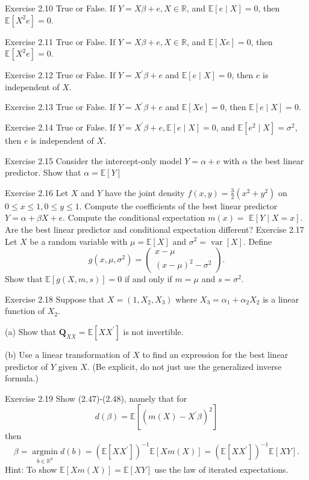 \documentclass[10pt]{article}
\begin{document}
Exercise 2.10 True or False. If $Y=X \beta+e, X \in \mathbb{R}$, and $\mathbb{E}[e \mid X]=0$, then $\mathbb{E}\left[X^{2} e\right]=0$.

Exercise 2.11 True or False. If $Y=X \beta+e, X \in \mathbb{R}$, and $\mathbb{E}[X e]=0$, then $\mathbb{E}\left[X^{2} e\right]=0$.

Exercise 2.12 True or False. If $Y=X^{\prime} \beta+e$ and $\mathbb{E}[e \mid X]=0$, then $e$ is independent of $X$.

Exercise 2.13 True or False. If $Y=X^{\prime} \beta+e$ and $\mathbb{E}[X e]=0$, then $\mathbb{E}[e \mid X]=0$.

Exercise 2.14 True or False. If $Y=X^{\prime} \beta+e, \mathbb{E}[e \mid X]=0$, and $\mathbb{E}\left[e^{2} \mid X\right]=\sigma^{2}$, then $e$ is independent of $X$.

Exercise 2.15 Consider the intercept-only model $Y=\alpha+e$ with $\alpha$ the best linear predictor. Show that $\alpha=\mathbb{E}[Y]$

Exercise 2.16 Let $X$ and $Y$ have the joint density $f(x, y)=\frac{3}{2}\left(x^{2}+y^{2}\right)$ on $0 \leq x \leq 1,0 \leq y \leq 1$. Compute the coefficients of the best linear predictor $Y=\alpha+\beta X+e$. Compute the conditional expectation $m(x)=$ $\mathbb{E}[Y \mid X=x]$. Are the best linear predictor and conditional expectation different? Exercise 2.17 Let $X$ be a random variable with $\mu=\mathbb{E}[X]$ and $\sigma^{2}=\operatorname{var}[X]$. Define
$$
g\left(x, \mu, \sigma^{2}\right)=\left(\begin{array}{c}
x-\mu \\
(x-\mu)^{2}-\sigma^{2}
\end{array}\right) .
$$
Show that $\mathbb{E}[g(X, m, s)]=0$ if and only if $m=\mu$ and $s=\sigma^{2}$.

Exercise 2.18 Suppose that $X=\left(1, X_{2}, X_{3}\right)$ where $X_{3}=\alpha_{1}+\alpha_{2} X_{2}$ is a linear function of $X_{2}$.

(a) Show that $\boldsymbol{Q}_{X X}=\mathbb{E}\left[X X^{\prime}\right]$ is not invertible.

(b) Use a linear transformation of $X$ to find an expression for the best linear predictor of $Y$ given $X$. (Be explicit, do not just use the generalized inverse formula.)

Exercise 2.19 Show (2.47)-(2.48), namely that for
$$
d(\beta)=\mathbb{E}\left[\left(m(X)-X^{\prime} \beta\right)^{2}\right]
$$
then
$$
\beta=\underset{b \in \mathbb{R}^{k}}{\operatorname{argmin}} d(b)=\left(\mathbb{E}\left[X X^{\prime}\right]\right)^{-1} \mathbb{E}[X m(X)]=\left(\mathbb{E}\left[X X^{\prime}\right]\right)^{-1} \mathbb{E}[X Y] .
$$
Hint: To show $\mathbb{E}[X m(X)]=\mathbb{E}[X Y]$ use the law of iterated expectations.
\end{document}
